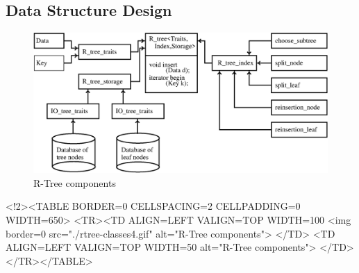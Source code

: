 \subsection{Data Structure Design}

\begin{ccTexOnly}
\begin{figure}
\begin{center}
\includegraphics[width=14cm,clip]{ExternalMemoryStructures/rtree-classes4.eps}
\end{center}
\caption{\label{User:r-tree-design} R-Tree components}
\end{figure}
\end{ccTexOnly}
\begin{ccHtmlOnly}
    <!2><TABLE BORDER=0 CELLSPACING=2 CELLPADDING=0 WIDTH=650>
        <TR><TD ALIGN=LEFT VALIGN=TOP WIDTH=100%
    <img border=0 src="./rtree-classes4.gif" alt="R-Tree components">
    </TD>
    <TD ALIGN=LEFT VALIGN=TOP WIDTH=50%
alt="R-Tree components">
      </TD></TR></TABLE>
\end{ccHtmlOnly}

